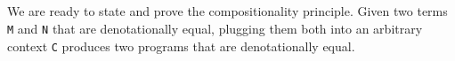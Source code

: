 \begin{fence}
\begin{code}%
\>[0]\AgdaSpace{}%
\AgdaSymbol{:}\AgdaSpace{}%
\AgdaSymbol{\}\{}\AgdaSymbol{\}}\AgdaSpace{}%
\AgdaSpace{}%
\AgdaSpace{}%
\AgdaSpace{}%
\AgdaSpace{}%
\AgdaSpace{}%
\AgdaSpace{}%
\AgdaSpace{}%
\AgdaSpace{}%
\AgdaSpace{}%
\AgdaSpace{}%
\AgdaSpace{}%
\<%
\\
\>[0]\AgdaSpace{}%
\AgdaSpace{}%
\AgdaSpace{}%
\AgdaSymbol{=}\AgdaSpace{}%
\<%
\\
\>[0]\AgdaSpace{}%
\AgdaSymbol{(}\AgdaSpace{}%
\AgdaSymbol{)}\AgdaSpace{}%
\AgdaSpace{}%
\AgdaSymbol{=}\AgdaSpace{}%
\AgdaSpace{}%
\AgdaSpace{}%
\AgdaSpace{}%
\<%
\\
\>[0]\AgdaSpace{}%
\AgdaSymbol{(}\AgdaSpace{}%
\AgdaSpace{}%
\AgdaSymbol{)}\AgdaSpace{}%
\AgdaSpace{}%
\AgdaSymbol{=}\AgdaSpace{}%
\AgdaSymbol{(}\AgdaSpace{}%
\AgdaSpace{}%
\AgdaSymbol{)}\AgdaSpace{}%
\AgdaSpace{}%
\<%
\\
\>[0]\AgdaSpace{}%
\AgdaSymbol{(}\AgdaSpace{}%
\AgdaSpace{}%
\AgdaSymbol{)}\AgdaSpace{}%
\AgdaSpace{}%
\AgdaSymbol{=}\AgdaSpace{}%
\AgdaSpace{}%
\AgdaSpace{}%
\AgdaSymbol{(}\AgdaSpace{}%
\AgdaSpace{}%
\AgdaSymbol{)}\<%
\end{code}
\end{fence}

We are ready to state and prove the compositionality principle. Given
two terms \texttt{M} and \texttt{N} that are denotationally equal,
plugging them both into an arbitrary context \texttt{C} produces two
programs that are denotationally equal.

